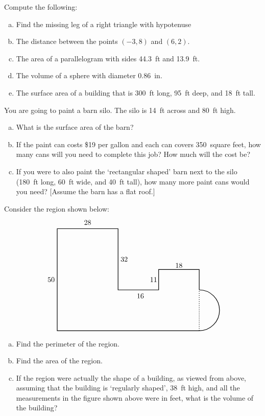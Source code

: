 \documentclass[11pt,letterpaper]{article}
\begin{document}

 Compute the following:
	\begin{enumerate}[(a)]
	\item Find the missing leg of a right triangle with hypotenuse 
	\item The distance between the points $(-3, 8)$ and $(6,2)$. 
	\item The area of a parallelogram with sides 44.3~ft and 13.9~ft. 
	\item The volume of a sphere with diameter 0.86~in.
	\item The surface area of a building that is 300~ft long, 95~ft deep, and 18~ft tall. 
	\end{enumerate}



\newpage



 You are going to paint a barn silo. The silo is 14~ft across and 80~ft high.
	\begin{enumerate}[(a)]
	\item What is the surface area of the barn?
	\item If the paint can costs \$19 per gallon and each can covers 350~square feet, how many cans will you need to complete this job? How much will the cost be?
	\item If you were to also paint the `rectangular shaped' barn next to the silo (180~ft long, 60~ft wide, and 40~ft tall), how many more paint cans would you need? [Assume the barn has a flat roof.]
	\end{enumerate}



\newpage



 Consider the region shown below:
	\[
	\begin{tikzpicture}
	\draw[line width=0.03cm] (7,0) -- (0,0) -- (0,5) -- (3,5) -- (3,2) -- (5,2) -- (5,3) -- (7,3) -- (7,2);
	\draw[line width=0.03cm] (7,0) arc(270:450:1);
	\draw[line width=0.03cm,dotted] (7,0) -- (7,2);
	
	\node at (-0.3,2.5) {$50$};
	\node at (1.5,5.3) {$28$};
	\node at (3.3,3.5) {$32$};
	\node at (4.75,2.5) {$11$};
	\node at (4.1,1.7) {$16$};
	\node at (6,3.2) {$18$};
	\end{tikzpicture}
	\]

\begin{enumerate}[(a)]
\item Find the perimeter of the region. 
\item Find the area of the region. 
\item If the region were actually the shape of a building, as viewed from above, assuming that the building is `regularly shaped', 38~ft high, and all the measurements in the figure shown above were in feet, what is the volume of the building?
\end{enumerate}
\end{document}
